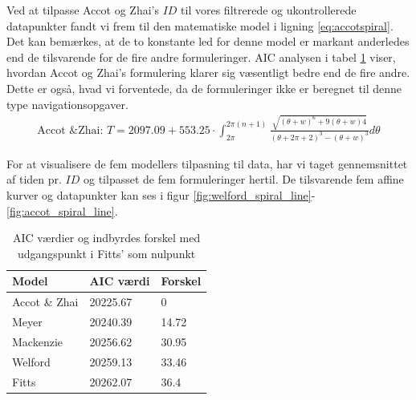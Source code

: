 \newpage
Ved at tilpasse Accot og Zhai's $ID$ til vores filtrerede og ukontrollerede datapunkter fandt vi frem til den matematiske model i ligning \ref{eq:accotspiral}. Det kan bemærkes, at de to konstante led for denne model er markant anderledes end de tilsvarende for de fire andre formuleringer.  AIC analysen i tabel \ref{tab:table_analysis_aic_spiral} viser, hvordan Accot og Zhai's formulering klarer sig væsentligt bedre end de fire andre. Dette er også, hvad vi forventede, da de formuleringer ikke er beregnet til denne type navigationsopgaver.
\begin{align}
\text{Accot \& Zhai: } T = 2097.09+553.25 \cdot \int_{2\pi}^{2\pi(n+1)}\frac{\sqrt{\left(\theta+w\right)^6+9\left(\theta+w\right)4}}{\left(\theta+2\pi+2\right)^3-\left(\theta+w\right)^3}d\theta
\label{eq:accotspiral}
\end{align}

For at visualisere de fem modellers tilpasning til data, har vi taget gennemsnittet af tiden pr. $ID$ og tilpasset de fem formuleringer hertil. De tilsvarende fem affine kurver og datapunkter kan ses i figur \ref{fig:welford_spiral_line}-\ref{fig:accot_spiral_line}.

\begin{table}[h]
\centering
\begin{tabular}{lll}
Model & AIC værdi & Forskel\\\hline
Accot \& Zhai & 20225.67 & 0\\
Meyer & 20240.39 & 14.72 \\
Mackenzie & 20256.62 & 30.95\\
Welford & 20259.13 & 33.46\\
Fitts & 20262.07 & 36.4
\end{tabular}
\caption{AIC værdier og indbyrdes forskel med udgangspunkt i Fitts' som nulpunkt}
\label{tab:table_analysis_aic_spiral}
\end{table}

